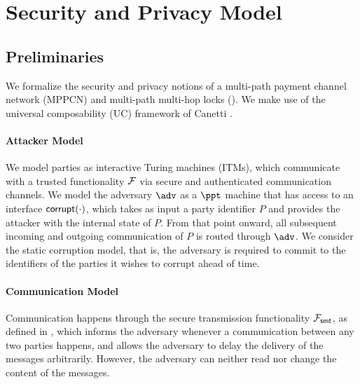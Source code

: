 \section{Security and Privacy Model}
\label{sec:security-model}

\subsection{Preliminaries}
\label{sec:model-prelims}

We formalize the security and privacy notions of a multi-path payment channel network (MPPCN) 
and multi-path multi-hop locks (\sysname). We make use of the universal composability (UC) 
framework of Canetti \cite{canetti}.

\paragraph{Attacker Model}
We model parties as interactive Turing machines (ITMs), which communicate with a trusted 
functionality $\mathcal{F}$ via secure and authenticated communication channels. We model the 
adversary $\adv$   as a $\ppt$ machine that has access to an interface $\mathsf{corrupt}(\cdot)$, 
which takes as input a party identifier $P$ and provides the attacker with the internal 
state of $P$. From that point onward, all subsequent incoming and outgoing communication 
of $P$ is routed through $\adv$. We consider the static corruption model, that is, the 
adversary is required to commit to the identifiers of the parties it wishes to corrupt 
ahead of time.

\paragraph{Communication Model}
Communication happens through the secure transmission functionality $\mathcal{F}_{\mathsf{smt}}$, as 
defined in \cite{canetti}, which informs the adversary whenever a communication between 
any two parties happens, and allows the adversary to delay the delivery of the messages 
arbitrarily. However, the adversary can neither read nor change the content of the messages.

